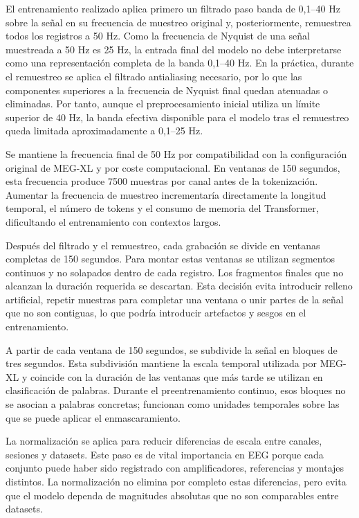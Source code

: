 El entrenamiento realizado aplica primero un filtrado paso banda de 0,1--40 Hz sobre la señal en su frecuencia de muestreo original y, posteriormente, remuestrea todos los registros a 50 Hz. Como la frecuencia de Nyquist de una señal muestreada a 50 Hz es 25 Hz, la entrada final del modelo no debe interpretarse como una representación completa de la banda 0,1--40 Hz. En la práctica, durante el remuestreo se aplica el filtrado antialiasing necesario, por lo que las componentes superiores a la frecuencia de Nyquist final quedan atenuadas o eliminadas. Por tanto, aunque el preprocesamiento inicial utiliza un límite superior de 40 Hz, la banda efectiva disponible para el modelo tras el remuestreo queda limitada aproximadamente a 0,1--25 Hz.

Se mantiene la frecuencia final de 50 Hz por compatibilidad con la configuración original de MEG-XL y por coste computacional. En ventanas de 150 segundos, esta frecuencia produce 7500 muestras por canal antes de la tokenización. Aumentar la frecuencia de muestreo incrementaría directamente la longitud temporal, el número de tokens y el consumo de memoria del Transformer, dificultando el entrenamiento con contextos largos.

Después del filtrado y el remuestreo, cada grabación se divide en ventanas completas de 150 segundos. Para montar estas ventanas se utilizan segmentos continuos y no solapados dentro de cada registro. Los fragmentos finales que no alcanzan la duración requerida se descartan. Esta decisión evita introducir relleno artificial, repetir muestras para completar una ventana o unir partes de la señal que no son contiguas, lo que podría introducir artefactos y sesgos en el entrenamiento.

A partir de cada ventana de 150 segundos, se subdivide la señal en bloques de tres segundos. Esta subdivisión mantiene la escala temporal utilizada por MEG-XL y coincide con la duración de las ventanas que más tarde se utilizan en clasificación de palabras. Durante el preentrenamiento continuo, esos bloques no se asocian a palabras concretas; funcionan como unidades temporales sobre las que se puede aplicar el enmascaramiento.

La normalización se aplica para reducir diferencias de escala entre canales, sesiones y datasets. Este paso es de vital importancia en EEG porque cada conjunto puede haber sido registrado con amplificadores, referencias y montajes distintos. La normalización no elimina por completo estas diferencias, pero evita que el modelo dependa de magnitudes absolutas que no son comparables entre datasets.

